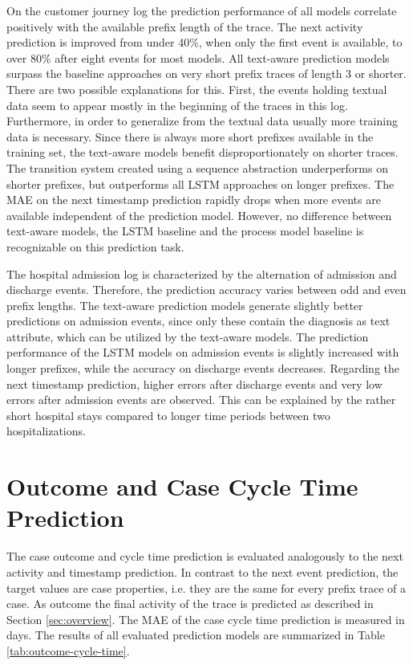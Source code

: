 On the customer journey log the prediction performance of all models correlate positively with the available prefix length of the trace.
The next activity prediction is improved from under 40\%, when only the first event is available, to over 80\% after eight events for most models.
All text-aware prediction models surpass the baseline approaches on very short prefix traces of length 3 or shorter.
There are two possible explanations for this.
First, the events holding textual data seem to appear mostly in the beginning of the traces in this log.
Furthermore, in order to generalize from the textual data usually more training data is necessary.
Since there is always more short prefixes available in the training set, the text-aware models benefit disproportionately on shorter traces.
The transition system created using a sequence abstraction underperforms on shorter prefixes, but outperforms all LSTM approaches on longer prefixes.
The MAE on the next timestamp prediction rapidly drops when more events are available independent of the prediction model.
However, no difference between text-aware models, the LSTM baseline and the process model baseline is recognizable on this prediction task.

The hospital admission log is characterized by the alternation of admission and discharge events.
Therefore, the prediction accuracy varies between odd and even prefix lengths.
The text-aware prediction models generate slightly better predictions on admission events, since only these contain the diagnosis as text attribute, which can be utilized by the text-aware models.
The prediction performance of the LSTM models on admission events is slightly increased with longer prefixes, while the accuracy on discharge events decreases.
Regarding the next timestamp prediction, higher errors after discharge events and very low errors after admission events are observed.
This can be explained by the rather short hospital stays compared to longer time periods between two hospitalizations.




\section{Outcome and Case Cycle Time Prediction}

The case outcome and cycle time prediction is evaluated analogously to the next activity and timestamp prediction.
In contrast to the next event prediction, the target values are case properties, i.e. they are the same for every prefix trace of a case.
As outcome the final activity of the trace is predicted as described in Section \ref{sec:overview}.
The MAE of the case cycle time prediction is measured in days.
The results of all evaluated prediction models are summarized in Table \ref{tab:outcome-cycle-time}.

